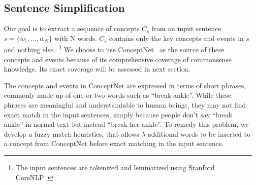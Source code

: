 \subsection{Sentence Simplification}
\label{sec:sentence simplification}


Our goal is to extract a sequence of concepts $C_s$
from an input sentence $s = \{w_1, ..., w_N\}$ with N words. 
$C_s$ contains only the key concepts and events in $s$ and 
nothing else.~\footnote{The input sentences are 
tokenized and lemmatized using Stanford CoreNLP~\cite{manning2014stanford} }
We choose to use ConceptNet~\cite{speer2017conceptnet} as the source of
these concepts and events because of its comprehensive coverage of 
commonsense knowledge. Its exact coverage will be assessed 
in next section. 

The concepts and events in ConceptNet are
expressed in terms of short phrases, commonly made up of one or two words
such as ``break ankle''. While these phrases are meaningful and
understandable to human beings, they may not find exact match
in the input sentences, simply because people don't say ``break ankle'' in
normal text but instead ``break her ankle''.  
To remedy this problem, we develop a fuzzy match heuristics, that allows
$\lambda$ additional words to be inserted to a concept from ConceptNet
before exact matching in the input sentence.

